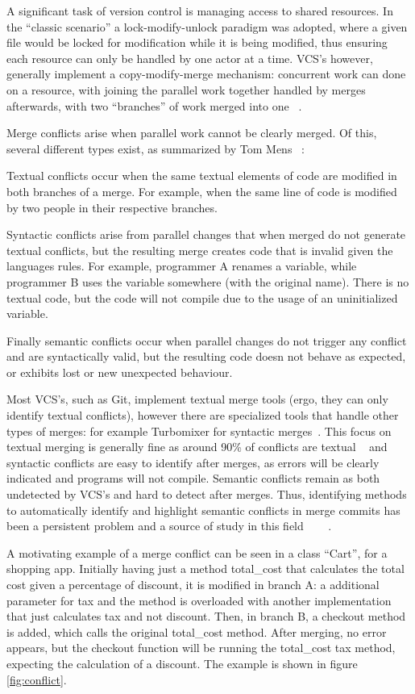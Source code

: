 A significant task of version control is managing access to shared resources.
In the ``classic scenario'' a lock-modify-unlock paradigm was adopted, where a given file would be locked for modification while it is being modified, thus ensuring each resource can only be handled by one actor at a time. VCS's however, generally implement a copy-modify-merge mechanism: concurrent work can done on a resource, with joining the parallel work together handled by merges afterwards, with two ``branches'' of work merged into one ~\citep{kn:vers_ott}.

Merge conflicts arise when parallel work cannot be clearly merged. Of this, several different types exist, as summarized by Tom Mens ~\citep{kn:tmens}:

Textual conflicts occur when the same textual elements of code are modified in both branches of a merge. For example, when the same line of code is modified by two people in their respective branches.

Syntactic conflicts arise from parallel changes that when merged do not generate textual conflicts, but the resulting merge creates code that is invalid given the languages rules. For example, programmer A renames a variable, while programmer B uses the variable somewhere (with the original name). There is no textual code, but the code will not compile due to the usage of an uninitialized variable.

Finally semantic conflicts occur when parallel changes do not trigger any conflict and are syntactically valid, but the resulting code doesn not behave as expected, or exhibits lost or new unexpected behaviour.

Most VCS's, such as Git, implement textual merge tools (ergo, they can only identify textual conflicts), however there are specialized tools that handle other types of merges: for example Turbomixer for syntactic merges~\citep{kn:tmens}. This focus on textual merging is generally fine as around 90\% of conflicts are textual ~\citep{kn:lcsd} and syntactic conflicts are easy to identify after merges, as errors will be clearly indicated and programs will not compile.
Semantic conflicts remain as both undetected by VCS's and hard to detect after merges. Thus, identifying methods to automatically identify and highlight semantic conflicts in merge commits has been a persistent problem and a source of study in this field~\citep{kn:nuno} ~\citep{kn:leuson} ~\citep{kn:leuson2}.


A motivating example of a merge conflict can be seen in a class ``Cart'', for a shopping app. Initially having just a method total\_cost that calculates the total cost given a percentage of discount, it is modified in branch A: a additional parameter for tax and the method is overloaded with another implementation that just calculates tax and not discount. Then, in branch B, a checkout method is added, which calls the original total\_cost method. After merging, no error appears, but the checkout function will be running the total\_cost tax method, expecting the calculation of a discount. The example is shown in figure \ref{fig:conflict}.

